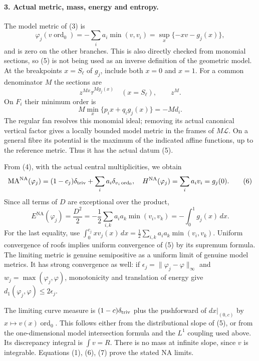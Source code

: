\documentclass[11pt]{article}
\newcommand{\NA}{\mathrm{NA}}
\newcommand{\MA}{\mathrm{MA}}
\begin{document}
\paragraph{3. Actual metric, mass, energy and entropy.}
The model metric of (3) is
\[
 \varphi_j(v\operatorname{ord}_0)
       =-\sum_i a_i\min(v,v_i)
       =\sup_x\{-xv-g_j(x)\},                           \tag{5}
\]
and is zero on the other branches. This is also directly checked
from monomial sections, so (5) is not being used as an inverse
definition of the geometric model. At the breakpoints $x=S_\ell$
of $g_j$, include both $x=0$ and $x=1$. For a common denominator $M$
the sections are
\[
 z^{Mx}\tau^{M g_j(x)}\quad (x=S_\ell),\qquad z^M.
\]
On $F_i$ their minimum order is
\[
 M\min_x\{p_i x+q_i g_j(x)\}=-M d_i.
\]
The regular fan resolves this monomial ideal; removing its actual
canonical vertical factor gives a locally bounded model metric
in the frames of $M\mathcal L$. On a general fibre its potential
is the maximum of the indicated affine functions, up to the
reference metric. Thus it has the actual datum (5).

From (4), with the actual central multiplicities, we obtain
\[
 \MA^\NA(\varphi_j)=(1-c_j)\delta_{\rm triv}
                         +\sum_i a_i\delta_{v_i\operatorname{ord}_0},
 \quad H^\NA(\varphi_j)=\sum_i a_i v_i=g_j(0).             \tag{6}
\]
Since all terms of $D$ are exceptional over the product,
\[
 E^\NA(\varphi_j)=\frac{D^2}{2}
   =-\frac12\sum_{i,k}a_i a_k\min(v_i,v_k)
   =-\int_0^1g_j(x)\,dx.                                \tag{7}
\]
For the last equality, use
$\int_0^{c_j}x v_j(x)\,dx
=\frac12\sum_{i,k}a_i a_k\min(v_i,v_k)$.
Uniform convergence of roofs implies uniform convergence of (5)
by its supremum formula. The limiting metric is genuine semipositive
as a uniform limit of genuine model metrics. It has strong convergence
as well: if $\epsilon_j=\|\varphi_j-\varphi\|_\infty$ and
$w_j=\max(\varphi_j,\varphi)$, monotonicity and translation of energy
give $d_1(\varphi_j,\varphi)\le2\epsilon_j$.

The limiting curve measure is $(1-c)\delta_{\rm triv}$ plus the
pushforward of $dx|_{(0,c)}$ by $x\mapsto v(x)\operatorname{ord}_0$.
This follows either from the distributional slope of (5), or from
the one-dimensional model intersection formula and the $L^1$
coupling used above. Its discrepancy integral is $\int v=R$.
There is no mass at infinite slope, since $v$ is integrable.
Equations (1), (6), (7) prove the stated NA limits.
\end{document}
